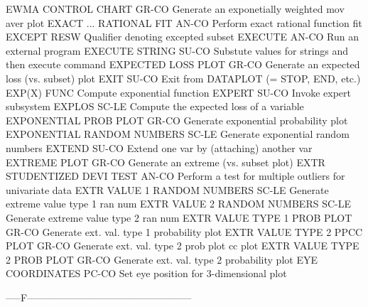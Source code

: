 EWMA CONTROL CHART          GR-CO Generate an exponetially weighted mov aver plot
EXACT ... RATIONAL FIT      AN-CO Perform exact rational function fit
EXCEPT                      RESW  Qualifier denoting excepted subset
EXECUTE                     AN-CO Run an external program
EXECUTE STRING              SU-CO Substute values for strings and then execute command
EXPECTED LOSS PLOT          GR-CO Generate an expected loss (vs. subset) plot
EXIT                        SU-CO Exit from DATAPLOT (= STOP, END, etc.)
EXP(X)                      FUNC  Compute exponential function
EXPERT                      SU-CO Invoke expert subsystem
EXPLOS                      SC-LE Compute the expected loss of a variable
EXPONENTIAL PROB PLOT       GR-CO Generate exponential probability plot
EXPONENTIAL RANDOM NUMBERS  SC-LE Generate exponential random numbers
EXTEND                      SU-CO Extend one var by (attaching) another var
EXTREME PLOT                GR-CO Generate an extreme (vs. subset plot)
EXTR STUDENTIZED DEVI TEST  AN-CO Perform a test for multiple outliers for univariate data
EXTR VALUE 1 RANDOM NUMBERS SC-LE Generate extreme value type 1 ran num
EXTR VALUE 2 RANDOM NUMBERS SC-LE Generate extreme value type 2 ran num
EXTR VALUE TYPE 1 PROB PLOT GR-CO Generate ext. val. type 1 probability plot
EXTR VALUE TYPE 2 PPCC PLOT GR-CO Generate ext. val. type 2 prob plot cc plot
EXTR VALUE TYPE 2 PROB PLOT GR-CO Generate ext. val. type 2 probability plot
EYE COORDINATES             PC-CO Set eye position for 3-dimensional plot

-----F--------------------------------------------------

